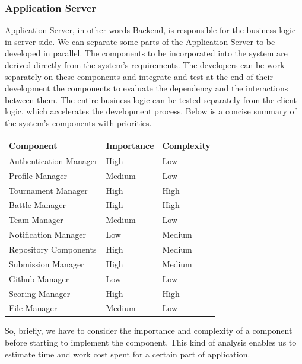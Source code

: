 \subsubsection{Application Server}
Application Server, in other words Backend, is responsible for the business logic in server side. We can separate some parts of the Application Server to be developed in parallel.
The components to be incorporated into the system are derived directly from the system's requirements. The developers can be work separately on these components and integrate and test at the end of their development the components to evaluate the dependency and the interactions between them. The entire business logic can be tested separately from the client logic, which accelerates the development process. Below is a concise summary of the system's components with priorities.
\begin{tabularx}{0.8\textwidth} { 
  | >{\raggedright\arraybackslash}X 
  | >{\centering\arraybackslash}X 
  | >{\raggedleft\arraybackslash}X | }
 \hline
\textbf{Component} & \textbf{Importance} &  \textbf{Complexity} \\
 \hline
 Authentication Manager  & High  & Low  \\
  \hline
 Profile Manager  & Medium  & Low  \\
\hline
 Tournament Manager  & High  & High  \\
\hline
 Battle Manager  & High  & High  \\
\hline
 Team Manager  & Medium  & Low  \\
\hline
 Notification Manager  & Low  & Medium  \\
\hline
 Repository Components  & High  & Medium  \\
\hline
 Submission Manager  & High  & Medium  \\
\hline
 Github Manager  & Low  & Low  \\
\hline
 Scoring Manager  & High  & High  \\
\hline
 File Manager  & Medium  & Low  \\
\hline
\end{tabularx}

So, briefly, we have to consider the importance and complexity of a component before starting to implement the component. This kind of analysis enables us to estimate time and work cost spent for a certain part of application.
\\

